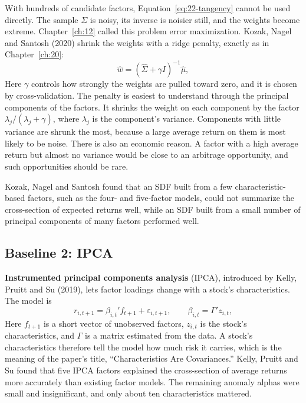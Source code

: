 With hundreds of candidate factors, Equation~\eqref{eq:22-tangency} cannot be used directly. The sample $\Sigma$ is noisy, its inverse is noisier still, and the weights become extreme. Chapter~\ref{ch:12} called this problem error maximization. Kozak, Nagel and Santosh (2020) shrink the weights with a ridge penalty, exactly as in Chapter~\ref{ch:20}:
\begin{equation}
  \hat w = \left(\hat\Sigma + \gamma I\right)^{-1} \hat\mu,
  \label{eq:22-kns}
\end{equation}
Here $\gamma$ controls how strongly the weights are pulled toward zero, and it is chosen by cross-validation. The penalty is easiest to understand through the principal components of the factors. It shrinks the weight on each component by the factor $\lambda_j/(\lambda_j+\gamma)$, where $\lambda_j$ is the component's variance. Components with little variance are shrunk the most, because a large average return on them is most likely to be noise. There is also an economic reason. A factor with a high average return but almost no variance would be close to an arbitrage opportunity, and such opportunities should be rare.

Kozak, Nagel and Santosh found that an SDF built from a few characteristic-based factors, such as the four- and five-factor models, could not summarize the cross-section of expected returns well, while an SDF built from a small number of principal components of many factors performed well.

\subsection{Baseline 2: IPCA}

\textbf{Instrumented principal components analysis} (IPCA), introduced by Kelly, Pruitt and Su (2019), lets factor loadings change with a stock's characteristics. The model is
\begin{equation}
  r_{i,t+1} = \beta_{i,t}' f_{t+1} + \varepsilon_{i,t+1}, \qquad \beta_{i,t} = \Gamma' z_{i,t},
  \label{eq:22-ipca}
\end{equation}
Here $f_{t+1}$ is a short vector of unobserved factors, $z_{i,t}$ is the stock's characteristics, and $\Gamma$ is a matrix estimated from the data. A stock's characteristics therefore tell the model how much risk it carries, which is the meaning of the paper's title, ``Characteristics Are Covariances.'' Kelly, Pruitt and Su found that five IPCA factors explained the cross-section of average returns more accurately than existing factor models. The remaining anomaly alphas were small and insignificant, and only about ten characteristics mattered.

